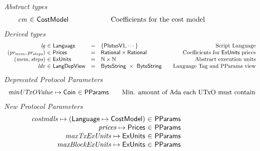 \begin{figure*}[htb]
  \emph{Abstract types}
  \begin{equation*}
    \begin{array}{r@{~\in~}l@{\qquad\qquad\qquad}r}
      \var{cm} & \CostMod & \text{Coefficients for the cost model}
    \end{array}
  \end{equation*}
  \emph{Derived types}
  \begin{equation*}
    \begin{array}{r@{~\in~}l@{\quad=\quad}l@{\qquad}r}
      \var{lg}
      & \Language
      & \{\PlutusVI, \dotsb\}
      & \text{Script Language}
      \\
      \var{(pr_{mem}, pr_{steps})}
      & \Prices
      & \mathsf{Rational} \times \mathsf{Rational}
      & \text {Coefficients for $\ExUnits$ prices}
      \\
      \var{(mem, steps)}
      & \ExUnits
      & \N \times \N
      & \text{Abstract execution units}
      \\
      \var{ldv}
      & \LangDepView
      & \ByteString~\times~\ByteString
      & \text{Language Tag and PParams view}
    \end{array}
  \end{equation*}
  \emph{Deprecated Protocol Parameters}
  \begin{equation*}
      \begin{array}{r@{~\in~}l@{\qquad}r}
        \var{minUTxOValue} \mapsto \Coin & \PParams & \text{Min. amount of Ada each UTxO must contain}
      \end{array}
  \end{equation*}
  \emph{New Protocol Parameters}
  \begin{equation*}
      \begin{array}{r@{~\in~}l@{\qquad}r}
        \var{costmdls} \mapsto (\Language \mapsto \CostMod) & \PParams \\
        \var{prices} \mapsto \Prices & \PParams \\
        \var{maxTxExUnits} \mapsto \ExUnits & \PParams \\
        \var{maxBlockExUnits} \mapsto \ExUnits & \PParams \\

\end{array}
\end{equation*}
\end{figure*}
